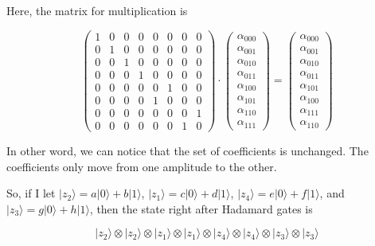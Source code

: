 \documentclass{article}
\begin{document}
Here, the matrix for multiplication is

\begin{equation}
    \begin{pmatrix}
        1 & 0 & 0 & 0 & 0 & 0 & 0 & 0 \\
        0 & 1 & 0 & 0 & 0 & 0 & 0 & 0 \\
        0 & 0 & 1 & 0 & 0 & 0 & 0 & 0 \\
        0 & 0 & 0 & 1 & 0 & 0 & 0 & 0 \\
        0 & 0 & 0 & 0 & 0 & 1 & 0 & 0 \\
        0 & 0 & 0 & 0 & 1 & 0 & 0 & 0 \\
        0 & 0 & 0 & 0 & 0 & 0 & 0 & 1 \\
        0 & 0 & 0 & 0 & 0 & 0 & 1 & 0
    \end{pmatrix} \cdot \begin{pmatrix}
        \alpha_{000} \\ \alpha_{001} \\ \alpha_{010} \\ \alpha_{011} \\ \alpha_{100} \\ \alpha_{101} \\ \alpha_{110} \\ \alpha_{111}
    \end{pmatrix} = \begin{pmatrix}
        \alpha_{000} \\ \alpha_{001} \\ \alpha_{010} \\ \alpha_{011} \\ \alpha_{101} \\ \alpha_{100} \\ \alpha_{111} \\ \alpha_{110}
    \end{pmatrix}
\end{equation}

In other word, we can notice that the set of coefficients is unchanged. The coefficients only move from one amplitude to the other.

So, if I let $\lvert z_2 \rangle = a \lvert 0 \rangle + b \lvert 1 \rangle$, $\lvert z_1 \rangle = c \lvert 0 \rangle + d \lvert 1 \rangle$, $\lvert z_4 \rangle = e \lvert 0 \rangle + f \lvert 1 \rangle$, and $\lvert z_3 \rangle = g \lvert 0 \rangle + h \lvert 1 \rangle$, then the state right after Hadamard gates is

\begin{equation}
    \lvert z_2 \rangle \otimes \lvert z_2 \rangle \otimes \lvert z_1 \rangle \otimes \lvert z_1 \rangle \otimes \lvert z_4 \rangle \otimes \lvert z_4 \rangle \otimes \lvert z_3 \rangle \otimes \lvert z_3 \rangle
\end{equation}
\end{document}
